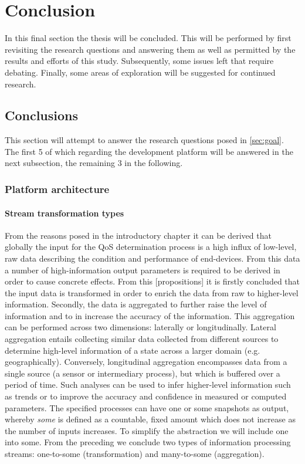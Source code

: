 \chapter{Conclusion}
In this final section the thesis will be concluded. This will be performed by first revisiting the research questions and answering them as well as permitted by the results and efforts of this study. Subsequently, some issues left that require debating. Finally, some areas of exploration will be suggested for continued research.

\section{Conclusions}
This section will attempt to answer the research questions posed in \ref{sec:goal}. The first 5 of which regarding the development platform will be answered in the next subsection, the remaining 3 in the following.
\subsection{Platform architecture}
\subsubsection{Stream transformation types}
From the reasons posed in the introductory chapter it can be derived that globally the input for the QoS determination process is a high influx of low-level, raw data describing the condition and performance of end-devices. From this data a number of high-information output parameters is required to be derived in order to cause concrete effects. From this [propositions] it is firstly concluded that the input data is transformed in order to enrich the data from raw to higher-level information. Secondly, the data is aggregated to further raise the level of information and to in increase the accuracy of the information. This aggregation can be performed across two dimensions: laterally or longitudinally. Lateral aggregation entails collecting similar data collected from different sources to determine high-level information of a state across a larger domain (e.g. geographically). Conversely, longitudinal aggregation encompasses data from a single source (a sensor or intermediary process), but which is buffered over a period of time. Such analyses can be used to infer higher-level information such as trends or to improve the accuracy and confidence in measured or computed parameters. The specified processes can have one or some snapshots as output, whereby \emph{some} is defined as a countable, fixed amount which does not increase as the number of inputs increases. To simplify the abstraction we will include one into some. From the preceding we conclude two types of information processing streams: one-to-some (transformation) and many-to-some (aggregation).

